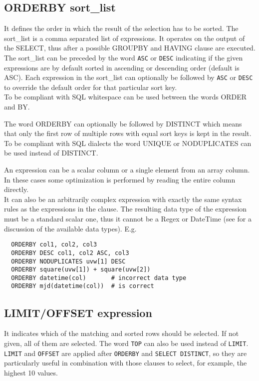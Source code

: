 \subsection{\label{TAQL:ORDERBY}ORDERBY sort\_list}
It defines the order in which the result of the selection
has to be sorted. The sort\_list is a comma separated list of
expressions. It operates on the output of the SELECT, thus after a
possible GROUPBY and HAVING clause are executed.
\\The sort\_list can be preceded by the word \texttt{ASC} or
\texttt{DESC} indicating if the given expressions are by
default sorted in ascending or descending order (default is ASC).
Each expression in the sort\_list can optionally be
followed by \texttt{ASC} or \texttt{DESC} to override the
default order for that particular sort key.
\\To be compliant with SQL whitespace can be used between the
words ORDER and BY.

The word ORDERBY can optionally be followed by DISTINCT
which means that only the first row of multiple rows with
equal sort keys is kept in the result. To be compliant with
SQL dialects the word UNIQUE or NODUPLICATES can be used
instead of DISTINCT.

An expression can be a scalar column or a single element from
an array column. In these cases some optimization is performed
by reading the entire column directly.
\\It can also be an arbitrarily complex expression
with exactly the same syntax rules as the expressions in the
 clause.
The resulting data type of the expression must
be a standard scalar one, thus it cannot be a Regex or
DateTime (see  for a discussion
of the available data types).
E.g.
\begin{verbatim}
  ORDERBY col1, col2, col3
  ORDERBY DESC col1, col2 ASC, col3
  ORDERBY NODUPLICATES uvw[1] DESC
  ORDERBY square(uvw[1]) + square(uvw[2])
  ORDERBY datetime(col)       # incorrect data type
  ORDERBY mjd(datetime(col))  # is correct
\end{verbatim}

\subsection{LIMIT/OFFSET expression}
It indicates which of the matching and sorted rows should be
selected. If not given, all of them are selected.
The word \texttt{TOP} can also be used instead of \texttt{LIMIT}.
\\\texttt{LIMIT} and \texttt{OFFSET} are applied after
\texttt{ORDERBY} and \texttt{SELECT DISTINCT},
so they are particularly useful in combination with those clauses
to select, for example, the highest 10 values.

